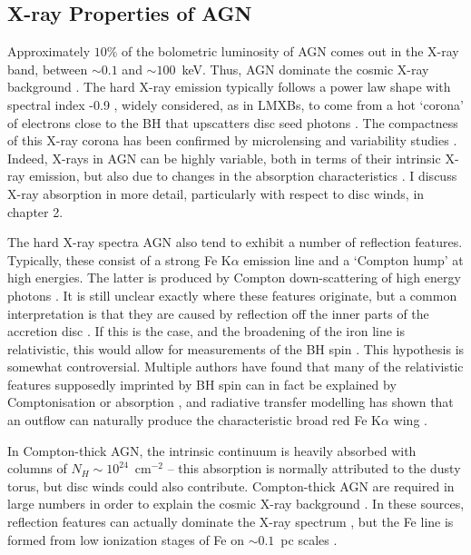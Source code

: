 \subsection{X-ray Properties of AGN}

Approximately $10\%$ of the bolometric luminosity of AGN
comes out in the X-ray band, between $\sim0.1$ and $\sim100$~keV.
Thus, AGN dominate the cosmic X-ray background \citep{madau1994}.
The hard X-ray emission typically follows a power law shape with spectral
index -0.9 \citep[e.g.][]{koratkar1999}, 
widely considered, as in LMXBs, to come from a hot `corona' of 
electrons close to the BH that upscatters disc seed photons
\citep[e.g.][]{haardt1991}. The compactness of this X-ray corona
has been confirmed by microlensing \citep{chartas2009, dai2010} 
and variability studies \citep{green1993,crenshaw1996,risaliti2007}. 
Indeed, X-rays in AGN can be highly variable, both in terms of their intrinsic 
X-ray emission, but also due to changes in the absorption characteristics 
\citep{risaliti2002,miller2008,connolly2014}.
I discuss X-ray absorption in more detail, particularly with respect to disc winds, 
in chapter 2.

The hard X-ray spectra AGN also tend to exhibit a number of reflection features. 
Typically, these consist of a strong Fe K$\alpha$ emission line and a `Compton hump'
at high energies. The latter is produced by Compton down-scattering 
of high energy photons \citep{pounds1989,nandra1994}.
It is still unclear exactly where these features originate, 
but a common interpretation is that they are caused by 
reflection off the inner parts of the accretion disc 
\citep{fabian1995,iwasawa1996b,reynolds1999}.
If this is the case, and the broadening of the iron line is relativistic,
this would allow for measurements of the BH spin 
\citep{laor1991,iwasawa1996a,dabrowski1997}.
This hypothesis is somewhat controversial. Multiple authors have found that 
many of the relativistic features supposedly imprinted by BH spin can in fact be explained
by Comptonisation or absorption \citep[e.g.][]{misra1998,miller2013}, 
and radiative transfer modelling has shown that
an outflow can naturally produce the characteristic broad red Fe K$\alpha$ wing \citep{sim2010}.

In Compton-thick AGN, the intrinsic continuum is heavily absorbed with columns of
$N_H\sim10^{24}$~cm$^{-2}$ -- this absorption is normally attributed to the dusty torus, 
but disc winds could also contribute. Compton-thick AGN are required 
in large numbers in order to explain the cosmic X-ray background \citep{setti1989}.
In these sources, reflection features can actually dominate the X-ray spectrum 
\citep{alexander2011,gandhi2013}, but the Fe line is formed from low ionization
stages of Fe on $\sim0.1$~pc scales \citep{gandhi2015}.



